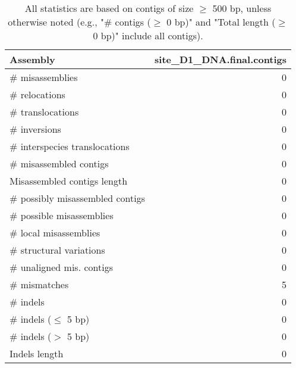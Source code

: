 \documentclass[12pt,a4paper]{article}
\begin{document}
\begin{table}[ht]
\begin{center}
\caption{All statistics are based on contigs of size $\geq$ 500 bp, unless otherwise noted (e.g., "\# contigs ($\geq$ 0 bp)" and "Total length ($\geq$ 0 bp)" include all contigs).}
\begin{tabular}{|l*{1}{|r}|}
\hline
Assembly & site\_D1\_DNA.final.contigs \\ \hline
\# misassemblies & 0 \\ \hline
\hspace{5mm}\# relocations & 0 \\ \hline
\hspace{5mm}\# translocations & 0 \\ \hline
\hspace{5mm}\# inversions & 0 \\ \hline
\hspace{5mm}\# interspecies translocations & 0 \\ \hline
\# misassembled contigs & 0 \\ \hline
Misassembled contigs length & 0 \\ \hline
\# possibly misassembled contigs & 0 \\ \hline
\hspace{5mm}\# possible misassemblies & 0 \\ \hline
\# local misassemblies & 0 \\ \hline
\# structural variations & 0 \\ \hline
\# unaligned mis. contigs & 0 \\ \hline
\# mismatches & 5 \\ \hline
\# indels & 0 \\ \hline
\hspace{5mm}\# indels ($\leq$ 5 bp) & 0 \\ \hline
\hspace{5mm}\# indels ($>$ 5 bp) & 0 \\ \hline
Indels length & 0 \\ \hline
\end{tabular}
\end{center}
\end{table}
\end{document}
